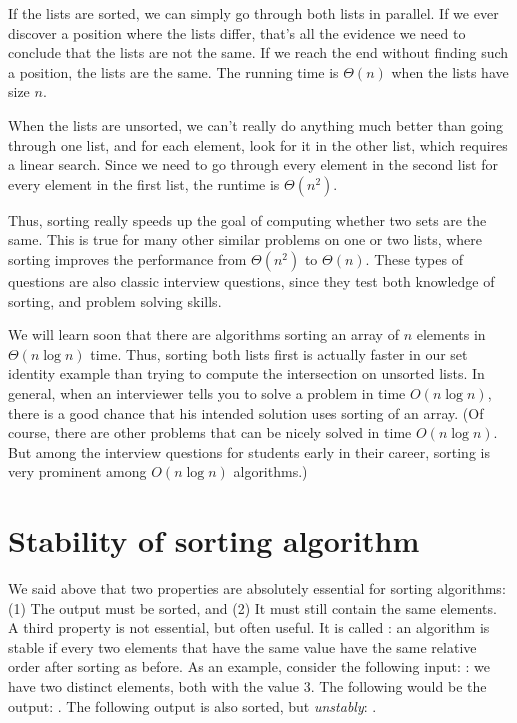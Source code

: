 If the lists are sorted, we can simply go through both lists in
parallel. If we ever discover a position where the lists differ,
that's all the evidence we need to conclude that the lists are not the
same. If we reach the end without finding such a position, the lists
are the same. The running time is $\Theta(n)$ when the lists have
size $n$.

When the lists are unsorted, we can't really do anything much better
than going through one list, and for each element, look for it in the
other list, which requires a linear search. 
Since we need to go through every element in the second list for every
element in the first list, the runtime is $\Theta (n^2)$.

Thus, sorting really speeds up the goal of computing whether two sets
are the same. This is true for many other similar problems on one or
two lists, where sorting improves the performance from $\Theta(n^2)$ to
$\Theta(n)$. These types of questions are also classic interview
questions, since they test both knowledge of sorting, and problem
solving skills. 

We will learn soon that there are algorithms sorting an
array of $n$ elements in $\Theta(n \log n)$ time. Thus, sorting both
lists first is actually faster in our set identity example than trying
to compute the intersection on unsorted lists.
In general, when an interviewer tells you to solve a problem in time
$O(n \log n)$, there is a good chance that his intended solution uses
sorting of an array. (Of course, there are other problems that can be
nicely solved in time $O(n \log n)$. But among the interview questions
for students early in their career, sorting is very prominent among
$O(n \log n)$ algorithms.)

\section{Stability of sorting algorithm}
We said above that two properties are absolutely essential for sorting
algorithms: (1) The output must be sorted, and (2) It must still
contain the same elements. A third property is not essential, but
often useful. It is called : an algorithm is stable if
every two elements that have the same value have the same relative
order after sorting as before. As an example, consider the following
input: : we have two distinct elements, both
with the value 3.
The following would be the  output: .
The following output is also sorted, but \emph{unstably}:
.

